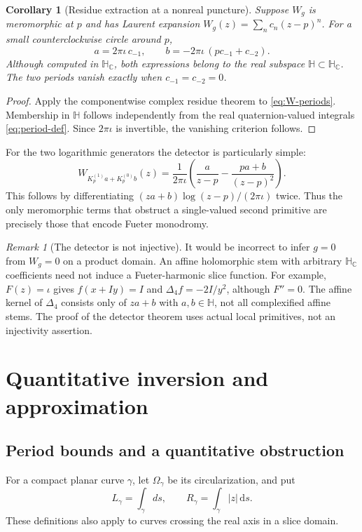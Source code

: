 \documentclass[11pt,a4paper]{article}
\numberwithin{equation}{section}
\newtheorem{corollary}[theorem]{Corollary}
\theoremstyle{definition}
\theoremstyle{remark}
\newtheorem{remark}[theorem]{Remark}
\newcommand{\C}{\mathbb C}
\newcommand{\HH}{\mathbb H}
\newcommand{\HC}{\mathbb H_{\C}}
\newcommand{\lap}{\Delta_4}
\newcommand{\dd}{\,\mathrm d}
\newcommand{\Kzero}{K_p^{(0)}}
\newcommand{\Kone}{K_p^{(1)}}
\begin{document}
\begin{corollary}[Residue extraction at a nonreal puncture]\label{cor:residues}
Suppose $W_g$ is meromorphic at $p$ and has Laurent expansion
$W_g(z)=\sum_n c_n(z-p)^n$. For a small counterclockwise circle around $p$,
\begin{equation}\label{eq:residue-periods}
 a=2\pi\iota\,c_{-1},\qquad
 b=-2\pi\iota\,(p c_{-1}+c_{-2}).
\end{equation}
Although computed in $\HC$, both expressions belong to the real subspace
$\HH\subset\HC$. The two periods vanish exactly when
$c_{-1}=c_{-2}=0$.
\end{corollary}
\begin{proof}
Apply the componentwise complex residue theorem to
\eqref{eq:W-periods}. Membership in $\HH$ follows independently from the
real quaternion-valued integrals \eqref{eq:period-def}. Since
$2\pi\iota$ is invertible, the vanishing criterion follows.
\end{proof}

For the two logarithmic generators the detector is particularly simple:
\begin{equation}\label{eq:W-logs}
 W_{\Kone a+\Kzero b}(z)=\frac{1}{2\pi\iota}
 \left(\frac{a}{z-p}-\frac{pa+b}{(z-p)^2}\right).
\end{equation}
This follows by differentiating
$(za+b)\log(z-p)/(2\pi\iota)$ twice. Thus the only meromorphic terms that
obstruct a single-valued second primitive are precisely those that encode
Fueter monodromy.

\begin{remark}[The detector is not injective]
It would be incorrect to infer $g=0$ from $W_g=0$ on a product domain. An
affine holomorphic stem with arbitrary $\HC$ coefficients need not induce a
Fueter-harmonic slice function. For example, $F(z)=\iota$ gives
$f(x+Iy)=I$ and $\lap f=-2I/y^2$, although $F''=0$. The affine kernel of
$\lap$ consists only of $za+b$ with $a,b\in\HH$, not all complexified affine
stems. The proof of the detector theorem uses actual local primitives, not
an injectivity assertion.
\end{remark}

\section{Quantitative inversion and approximation}
\label{sec:approximation}

\subsection{Period bounds and a quantitative obstruction}
For a compact planar curve $\gamma$, let $\Omega_\gamma$ be its circularization,
and put
\[
 L_\gamma=\int_\gamma ds,\qquad
 R_\gamma=\int_\gamma |z|\dd s.
\]
These definitions also apply to curves crossing the real axis in a slice
domain.
\end{document}
